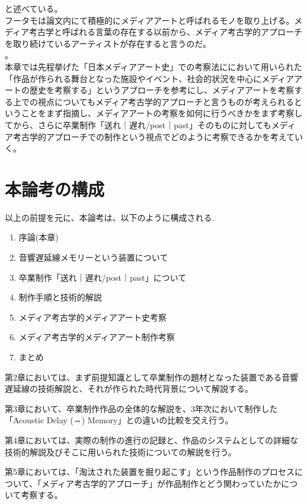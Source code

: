 と述べている\autocite{ohta:mediaarch}。\\
フータモは論文内にて積極的にメディアアートと呼ばれるモノを取り上げる\autocite{huhtamo:mediaarcheology}。メディア考古学と呼ばれる言葉の存在する以前から、メディア考古学的アプローチを取り続けているアーティストが存在すると言うのだ。\\
。\\
本章では先程挙げた「日本メディアアート史」での考察法ににおいて用いられた「作品が作られる舞台となった施設やイベント、社会的状況を中心にメディアアートの歴史を考察する」というアプローチを参考にし、メディアアートを考察する上での視点についてもメディア考古学的アプローチと言うものが考えられるということをまず指摘し、メディアアートの考察を如何に行うべきかをまず考察してから、さらに卒業制作「送れ｜遅れ/post｜past」そのものに対してもメディア考古学的アプローチでの制作という視点でどのように考察できるかを考えていく。

\section{本論考の構成}\label{ux672cux8ad6ux8003ux306eux69cbux6210}

以上の前提を元に、本論考は、以下のように構成される.

\begin{enumerate}
\def\labelenumi{\arabic{enumi}.}
\tightlist
\item
  序論(本章)
\item
  音響遅延線メモリーという装置について
\item
  卒業制作「送れ｜遅れ/post｜past」について
\item
  制作手順と技術的解説
\item
  メディア考古学的メディアアート史考察
\item
  メディア考古学的メディアアート制作考察
\item
  まとめ
\end{enumerate}

第2章においては、まず前提知識として卒業制作の題材となった装置である音響遅延線の技術解説と、それが作られた時代背景について解説する。

第3章において、卒業制作作品の全体的な解説を、3年次において制作した「Acoustic
Delay (⇔) Memory」との違いの比較を交え行う。

第4章においては、実際の制作の進行の記録と、作品のシステムとしての詳細な技術的解説及びそこに用いられた技術についての解説を行う。

第5章においては、「淘汰された装置を掘り起こす」という作品制作のプロセスについて、「メディア考古学的アプローチ」が作品制作とどう関わっていたかについて考察する。

